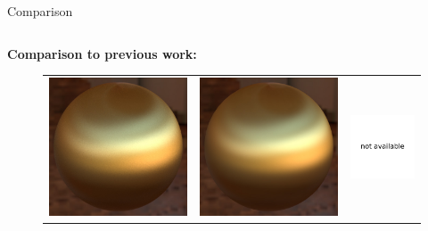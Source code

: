 \documentclass[final]{beamer}
\newlength{\onecolwid}
\newlength{\twocolwid}
\begin{document}
\begin{frame}[t]
\begin{columns}[t]
\begin{column}{\twocolwid}
\begin{block}{Comparison}
            \vspace{0.5cm}
            \begin{columns}[t,totalwidth=\twocolwid]
                \begin{column}{\onecolwid} 
                    \textbf{Comparison to previous work:}
                    \begin{figure}
                        \vspace{-1cm}
                    	\begin{tabular}{ccc}
                    	    \includegraphics[width=0.32\columnwidth]{validations/compare2/aniso_comb_hor_hor_512spp_17min.jpg} &
                    	    \includegraphics[width=0.32\columnwidth]{validations/compare2/aniso_comb_hor_hor_wenzel.jpg} &
                    	    \includegraphics[width=0.32\columnwidth]{validations/compare2/na.pdf} \\
                    

\end{tabular}
\end{figure}
\end{column}
\end{columns}
\end{block}
\end{column}
\end{columns}
\end{frame}
\end{document}
